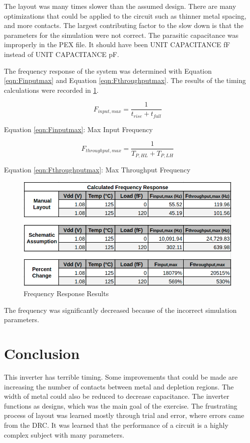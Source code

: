 \documentclass[11pt]{article}
\begin{document}
		The layout was many times slower than the assumed design. There are many optimizations that could be applied to the circuit such as thinner metal spacing, and more contacts. The largest contributing factor to the slow down is that the parameters for the simulation were not correct. The parasitic capacitance was improperly in the PEX file. It should have been UNIT CAPACITANCE fF instead of UNIT CAPACITANCE pF.
		
		The frequency response of the system was determined with Equation \ref{eqn:Finputmax} and Equation \ref{eqn:Fthroughputmax}. The results of the timing calculations were recorded in \ref{fig:frequency-response-results}. 
	
	
		\begin{equation}\label{eqn:Finputmax}
		F_{input,max} = \frac{1}{t_{rise}+t_{fall}}
		\end{equation}
		\begin{center}
			Equation \ref{eqn:Finputmax}: Max Input Frequency
		\end{center}
		
		\begin{equation}\label{eqn:Fthroughputmax}
		F_{throughput,max} = \frac{1}{T_{P,HL}+T_{P,LH}}
		\end{equation}
		\begin{center}
			Equation \ref{eqn:Fthroughputmax}: Max Throughput Frequency 
		\end{center}
		
		\begin{figure}[H]
			\centering
			\includegraphics[width=0.7\linewidth]{"Pictures/Frequency Response Results"}
			\caption{Frequency Response Results}
			\label{fig:frequency-response-results}
		\end{figure}
	
		The frequency was significantly decreased because of the incorrect simulation parameters.

\clearpage
\vfill
\section{Conclusion}
	This inverter has terrible timing. Some improvements that could be made are increasing the number of contacts between metal and depletion regions. The width of metal could also be reduced to decrease capacitance. The inverter functions as designs, which was the main goal of the exercise. The frustrating process of layout was learned mostly through trial and error, where errors came from the DRC. It was learned that the performance of a circuit is a highly complex subject with many parameters. 
\end{document}

